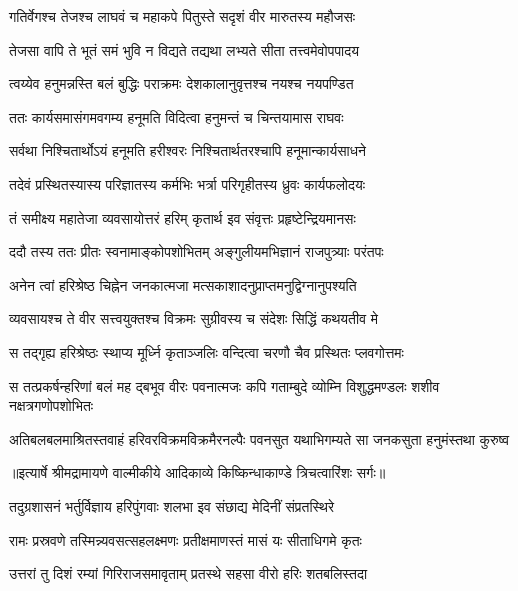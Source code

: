 \twolineshloka
{गतिर्वेगश्च तेजश्च लाघवं च महाकपे}
{पितुस्ते सदृशं वीर मारुतस्य महौजसः} %

\twolineshloka
{तेजसा वापि ते भूतं समं भुवि न विद्यते}
{तद्यथा लभ्यते सीता तत्त्वमेवोपपादय} %

\twolineshloka
{त्वय्येव हनुमन्नस्ति बलं बुद्धिः पराक्रमः}
{देशकालानुवृत्तश्च नयश्च नयपण्डित} %

\twolineshloka
{ततः कार्यसमासंगमवगम्य हनूमति}
{विदित्वा हनुमन्तं च चिन्तयामास राघवः} %

\twolineshloka
{सर्वथा निश्चितार्थोऽयं हनूमति हरीश्वरः}
{निश्चितार्थतरश्चापि हनूमान्कार्यसाधने} %

\twolineshloka
{तदेवं प्रस्थितस्यास्य परिज्ञातस्य कर्मभिः}
{भर्त्रा परिगृहीतस्य ध्रुवः कार्यफलोदयः} %

\twolineshloka
{तं समीक्ष्य महातेजा व्यवसायोत्तरं हरिम्}
{कृतार्थ इव संवृत्तः प्रहृष्टेन्द्रियमानसः} %

\twolineshloka
{ददौ तस्य ततः प्रीतः स्वनामाङ्कोपशोभितम्}
{अङ्गुलीयमभिज्ञानं राजपुत्र्याः परंतपः} %

\twolineshloka
{अनेन त्वां हरिश्रेष्ठ चिह्नेन जनकात्मजा}
{मत्सकाशादनुप्राप्तमनुद्विग्नानुपश्यति} %

\twolineshloka
{व्यवसायश्च ते वीर सत्त्वयुक्तश्च विक्रमः}
{सुग्रीवस्य च संदेशः सिद्धिं कथयतीव मे} %

\twolineshloka
{स तद्गृह्य हरिश्रेष्ठः स्थाप्य मूर्ध्नि कृताञ्जलिः}
{वन्दित्वा चरणौ चैव प्रस्थितः प्लवगोत्तमः} %

\fourlineindentedshloka
{स तत्प्रकर्षन्हरिणां बलं मह}
{द्बभूव वीरः पवनात्मजः कपि}
{गताम्बुदे व्योम्नि विशुद्धमण्डलः}
{ शशीव नक्षत्रगणोपशोभितः} %

\fourlineindentedshloka
{अतिबलबलमाश्रितस्तवाहं}
{ हरिवरविक्रमविक्रमैरनल्पैः}
{पवनसुत यथाभिगम्यते सा}
{ जनकसुता हनुमंस्तथा कुरुष्व} %


{॥इत्यार्षे श्रीमद्रामायणे वाल्मीकीये आदिकाव्ये किष्किन्धाकाण्डे त्रिचत्वारिंशः सर्गः॥}


\twolineshloka
{तदुग्रशासनं भर्तुर्विज्ञाय हरिपुंगवाः}
{शलभा इव संछाद्य मेदिनीं संप्रतस्थिरे} %

\twolineshloka
{रामः प्रस्रवणे तस्मिन्न्यवसत्सहलक्ष्मणः}
{प्रतीक्षमाणस्तं मासं यः सीताधिगमे कृतः} %

\twolineshloka
{उत्तरां तु दिशं रम्यां गिरिराजसमावृताम्}
{प्रतस्थे सहसा वीरो हरिः शतबलिस्तदा} %

